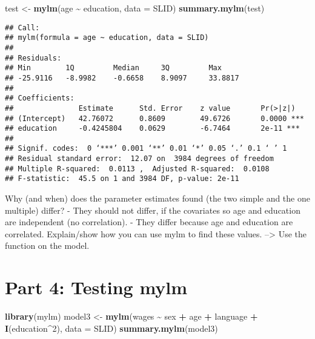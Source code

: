 \documentclass[
]{article}
\newenvironment{Shaded}{\begin{snugshade}}{\end{snugshade}}
\newcommand{\AttributeTok}[1]{\textcolor[rgb]{0.13,0.29,0.53}{#1}}
\newcommand{\DecValTok}[1]{\textcolor[rgb]{0.00,0.00,0.81}{#1}}
\newcommand{\FunctionTok}[1]{\textcolor[rgb]{0.13,0.29,0.53}{\textbf{#1}}}
\newcommand{\NormalTok}[1]{#1}
\newcommand{\OtherTok}[1]{\textcolor[rgb]{0.56,0.35,0.01}{#1}}
\newcommand{\SpecialCharTok}[1]{\textcolor[rgb]{0.81,0.36,0.00}{\textbf{#1}}}
\begin{document}
\begin{Shaded}
\begin{Highlighting}[]
\NormalTok{test }\OtherTok{\textless{}{-}} \FunctionTok{mylm}\NormalTok{(age }\SpecialCharTok{\textasciitilde{}}\NormalTok{ education, }\AttributeTok{data =}\NormalTok{ SLID)}
\FunctionTok{summary.mylm}\NormalTok{(test)}
\end{Highlighting}
\end{Shaded}

\begin{verbatim}
## Call:
## mylm(formula = age ~ education, data = SLID)
## 
## Residuals:
## Min        1Q         Median     3Q         Max        
## -25.9116   -8.9982    -0.6658    8.9097     33.8817    
## 
## Coefficients:
##               Estimate      Std. Error    z value       Pr(>|z|)      
## (Intercept)   42.76072      0.8609        49.6726       0.0000 ***    
## education     -0.4245804    0.0629        -6.7464       2e-11 ***     
## 
## Signif. codes:  0 ‘***’ 0.001 ‘**’ 0.01 ‘*’ 0.05 ‘.’ 0.1 ‘ ’ 1
## Residual standard error:  12.07 on  3984 degrees of freedom 
## Multiple R-squared:  0.0113 ,  Adjusted R-squared:  0.0108 
## F-statistic:  45.5 on 1 and 3984 DF, p-value: 2e-11
\end{verbatim}

Why (and when) does the parameter estimates found (the two simple and
the one multiple) differ? - They should not differ, if the covariates so
age and education are independent (no correlation). - They differ
because age and education are correlated. Explain/show how you can use
mylm to find these values. --\textgreater{} Use the function on the
model.

\hypertarget{part-4-testing-mylm}{%
\section{Part 4: Testing mylm}\label{part-4-testing-mylm}}

\begin{Shaded}
\begin{Highlighting}[]
\FunctionTok{library}\NormalTok{(mylm)}
\NormalTok{model3 }\OtherTok{\textless{}{-}} \FunctionTok{mylm}\NormalTok{(wages }\SpecialCharTok{\textasciitilde{}}\NormalTok{ sex }\SpecialCharTok{+}\NormalTok{ age }\SpecialCharTok{+}\NormalTok{ language }\SpecialCharTok{+} \FunctionTok{I}\NormalTok{(education}\SpecialCharTok{\^{}}\DecValTok{2}\NormalTok{), }\AttributeTok{data =}\NormalTok{ SLID)}
\FunctionTok{summary.mylm}\NormalTok{(model3)}
\end{Highlighting}
\end{Shaded}
\end{document}
